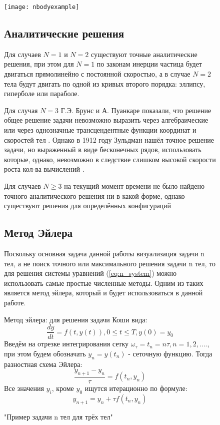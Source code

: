 \begin{figure}[h]
	\centering
	\texttt{[image: nbodyexample]}
	\caption{"Пример задачи n тел для трёх тел"}
	\label{fig:nbodyexample}

\subsection{Аналитические решения}
Для случаев $N = 1$ и $N = 2$ существуют точные аналитические решения, при этом для $N = 1$ по законам инерции частица будет двигаться прямолинейно с постоянной скоростью, а в случае $N = 2$ тела будут двигать по одной из кривых второго порядка: эллипсу, гиперболе или параболе.

Для случая $N = 3$ Г.Э. Брунс и А. Пуанкаре показали, что решение общее решение задачи невозможно выразить через алгебраические или через однозначные трансцендентные функции координат и скоростей тел \cite{markeev}. Однако в 1912 году Зульдман нашёл точное решение задачи, но выраженный в виде бесконечных рядов, использовать которые, однако, невозможно в следствие слишком высокой скорости роста кол-ва вычислений \cite{markeev}.

Для случаев $N \geq 3$ на текущий момент времени не было найдено точного аналитического решения ни в какой форме, однако существуют решения для определённых конфигураций
\subsection{Метод Эйлера}
Поскольку основная задача данной работы визуализация задачи n тел, а не поиск точного или максимального решения задачи n тел, то для решения системы уравнений (\ref{eq:n_system}) можно использовать самые простые численные методы. Одним из таких является метод эйлера, который и будет использоваться в данной работе.

Метод эйлера: для решения задачи Коши вида:
\begin{equation}
	\label{eq:koshi}
	\frac{dy}{dt} = f(t, y(t)), 0 \leq t \leq T, y(0) = y_0
\end{equation}
Введём на отрезке интегрирования сетку $\omega_\tau = {t_n = n\tau, n = 1,2,....}$, при этом будем обозначать $y_n = y(t_n)$  - сеточную функцию.
Тогда разностная схема Эйлера:
\begin{equation}
	\label{eq:euler_frac}
	\frac{y_{n+1} - y_n}{\tau} = f(t_n, y_n)
\end{equation}
Все значения $y_i$, кроме $y_0$ ищутся итерационно по формуле:
\begin{equation}
	\label{eq:euler_formula}
	y_{n+1} = y_n + \tau f(t_n, y_n)
\end{equation}


\end{figure}
